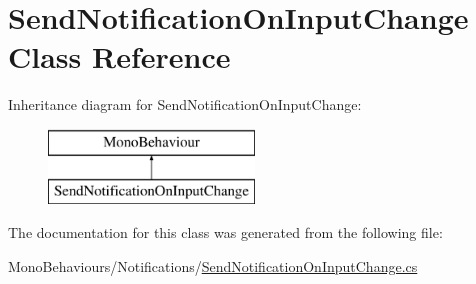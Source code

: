 \hypertarget{class_send_notification_on_input_change}{}\section{Send\+Notification\+On\+Input\+Change Class Reference}
\label{class_send_notification_on_input_change}
Inheritance diagram for Send\+Notification\+On\+Input\+Change\+:\begin{figure}[H]
\begin{center}
\leavevmode
\includegraphics[height=2.000000cm]{class_send_notification_on_input_change}
\end{center}
\end{figure}


The documentation for this class was generated from the following file\+:\begin{DoxyCompactItemize}
\item 
Mono\+Behaviours/\+Notifications/\hyperlink{_send_notification_on_input_change_8cs}{Send\+Notification\+On\+Input\+Change.\+cs}\end{DoxyCompactItemize}

